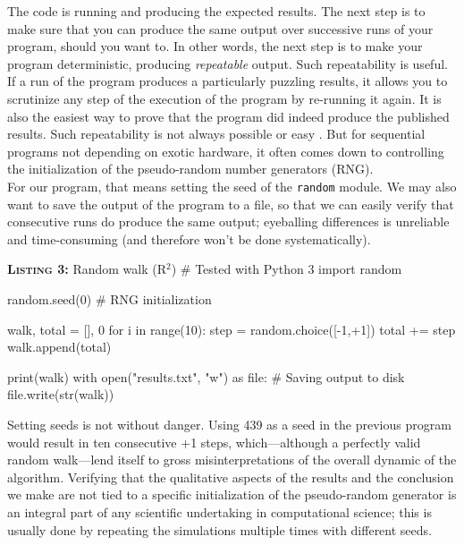\documentclass[a4paper,11pt]{article}
\begin{document}
The code is running and producing the expected results. 
The next step is to make sure that you can produce the same output over successive runs of your program, should you want to. 
In other words, the next step is to make your program deterministic,  producing {\em repeatable} output. 
Such repeatability is useful. 
If a run of the program produces a particularly puzzling results,  it allows you to scrutinize any step of the execution of the program by re-running it again. 
It is also the easiest way to prove that the program did indeed produce the published results.
Such repeatability is not always possible or easy \citep{Diethelm:2012, Courtes:2015}.
But for sequential programs not depending on exotic hardware, it often comes down to controlling the initialization of the pseudo-random number generators (RNG).\\ 

For our program, that means setting the seed of the {\tt random} module. We may also want to save the output of the program to a file, so that we can easily verify that consecutive runs do produce the same output; eyeballing differences is unreliable and  time-consuming (and therefore won't be done systematically).

\begin{code}{\textbf{\textsc{Listing 3:}} Random walk (R$^2$)}
# Tested with Python 3
import random

random.seed(0) # RNG initialization

walk, total = [], 0
for i in range(10):
    step = random.choice([-1,+1])     
    total += step
    walk.append(total)
    
print(walk)
with open("results.txt", "w") as file: # Saving output to disk
    file.write(str(walk))
\end{code}

Setting seeds is not without danger. 
Using 439 as a seed in the previous program would result in ten consecutive +1 steps, which---although a perfectly valid random walk---lend itself to gross misinterpretations of the overall dynamic of the algorithm. 
Verifying that the qualitative aspects of the results and the conclusion we make are not tied to a specific initialization of the pseudo-random generator is an integral part of any scientific undertaking in computational science; 
this is usually done by repeating the simulations multiple times with different seeds.  

\end{document}
